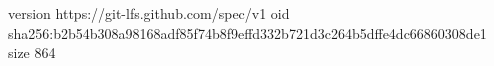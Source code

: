 version https://git-lfs.github.com/spec/v1
oid sha256:b2b54b308a98168adf85f74b8f9effd332b721d3c264b5dffe4dc66860308de1
size 864

